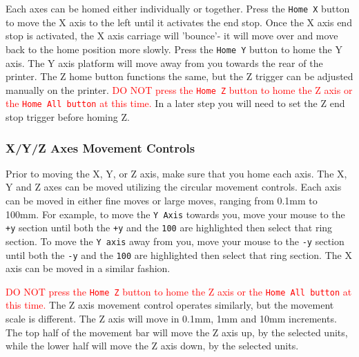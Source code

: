 Each axes can be homed either individually or together. Press the \texttt{Home X} button to move the X axis to the left until it activates the end stop. Once the X axis end stop is activated, the X axis carriage will 'bounce'- it will move over and move back to the home position more slowly. Press the \texttt{Home Y} button to home the Y axis. The Y axis platform will move away from you towards the rear of the printer. The Z home button functions the same, but the Z trigger can be adjusted manually on the printer. \textcolor{red}{DO NOT press the \texttt{Home Z} button to home the Z axis or the \texttt{Home All button} at this time.} In a later step you will need to set the Z end stop trigger before homing Z.

\subsubsection{X/Y/Z Axes Movement Controls}
Prior to moving the X, Y, or Z axis, make sure that you home each axis. The X, Y and Z axes can be moved utilizing the circular movement controls. Each axis can be moved in either fine moves or large moves, ranging from 0.1mm to 100mm.  For example, to move the \texttt{Y Axis} towards you, move your mouse to the \texttt{+y} section until both the \texttt{+y} and the \texttt{100} are highlighted then select that ring section. To move the \texttt{Y axis} away from you, move your mouse to the \texttt{-y} section until both the \texttt{-y} and the \texttt{100} are highlighted then select that ring section. The X axis can be moved in a similar fashion.

\textcolor{red}{DO NOT press the \texttt{Home Z} button to home the Z axis or the \texttt{Home All button} at this time.} The Z axis movement control operates similarly, but the movement scale is different. The Z axis will move in 0.1mm, 1mm and 10mm increments. The top half of the movement bar will move the Z axis up, by the selected units, while the lower half will move the Z axis down, by the selected units. 




